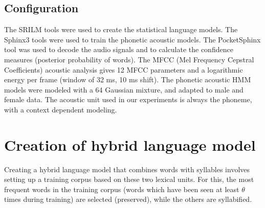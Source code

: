 \documentclass[a4paper]{article}
\begin{document}
\subsection{Configuration}

The SRILM tools \cite{Stolcke2002} were used to create the statistical language models.
The Sphinx3 tools \cite{Placeway1996} were used to train the phonetic acoustic models.
The PocketSphinx tool \cite{Huggins2006} was used to decode the audio signals and to calculate the confidence measures (posterior probability of words).
The MFCC (Mel Frequency Cepstral Coefficients) acoustic analysis gives 12 MFCC parameters and a logarithmic energy per frame (window of 32 ms, 10 ms shift).
The phonetic acoustic HMM models were modeled with a 64 Gaussian mixture, and adapted to male and female data.
The acoustic unit used in our experiments is always the phoneme, with a context dependent modeling.

\section{Creation of hybrid language model}

Creating a hybrid language model that combines words with syllables involves setting up a training corpus based on these two lexical units. For this, the most frequent words in the training corpus (words which have been seen at least $\theta$ times during training) are selected (preserved), while the others are syllabified.
\end{document}
